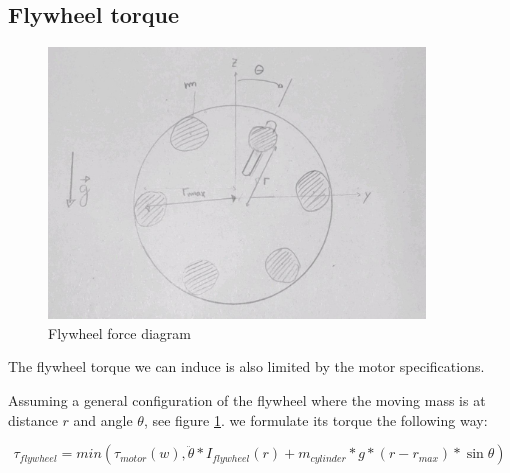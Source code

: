 \subsection{Flywheel torque}

\begin{figure}
	\centering
	\includegraphics[width=10cm]{img/flywheel_diagram.jpg}
	\caption{Flywheel force diagram}
	\label{fig:Flywheel force diagram}
\end{figure}

The flywheel torque we can induce is also limited by the motor specifications. 

Assuming a general configuration of the flywheel where the moving mass is at distance $r$ and angle $\theta$, see figure \ref{fig:Flywheel force diagram}. we formulate its torque the following way:

\begin{equation}\label{flywheel equation}
    \tau_{flywheel} = min(\tau_{motor} (w), \ddot{\theta}*I_{flywheel}(r) + m_{cylinder} * g * (r - r_{max}) * \sin{\theta})  
\end{equation}

